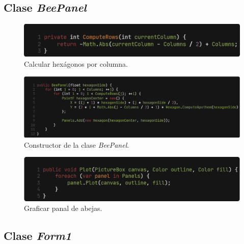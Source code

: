\documentclass[oneside, a4paper]{article}
\begin{document}
        \subsection{Clase \textit{BeePanel}}

            \begin{figure}[H]
                \centering
                \includegraphics[width=\textwidth]{compute_rows.png}
                \caption{Calcular hexágonos por columna.}
                \label{fig:compute_rows}
            \end{figure}

            \begin{figure}[H]
                \centering
                \includegraphics[width=\textwidth]{bee_panel_constructor.png}
                \caption{Constructor de la clase \textit{BeePanel}.}
                \label{fig:bee_panel_constructor}
            \end{figure}

            \begin{figure}[H]
                \centering
                \includegraphics[width=\textwidth]{plot_bee_panel.png}
                \caption{Graficar panal de abejas.}
                \label{fig:plot_bee_panel}
            \end{figure}

        \subsection{Clase \textit{Form1}}
\end{document}
